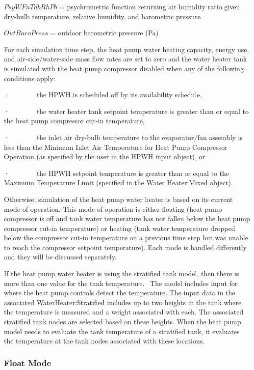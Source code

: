 \(PsyWFnTdbRhPb\) = psychrometric function returning air humidity ratio given dry-bulb temperature, relative humidity, and barometric pressure

\(OutBaroPress\) = outdoor barometric pressure (Pa)

For each simulation time step, the heat pump water heating capacity, energy use, and air-side/water-side mass flow rates are set to zero and the water heater tank is simulated with the heat pump compressor disabled when any of the following conditions apply:

·~~~~~~~~the HPWH is scheduled off by its availability schedule,

·~~~~~~~~the water heater tank setpoint temperature is greater than or equal to the heat pump compressor cut-in temperature,

·~~~~~~~~the inlet air dry-bulb temperature to the evaporator/fan assembly is less than the Minimum Inlet Air Temperature for Heat Pump Compressor Operation (as specified by the user in the HPWH input object), or

·~~~~~~~~the HPWH setpoint temperature is greater than or equal to the Maximum Temperature Limit (specified in the Water Heater:Mixed object).

Otherwise, simulation of the heat pump water heater is based on its current mode of operation. This mode of operation is either floating (heat pump compressor is off and tank water temperature has not fallen below the heat pump compressor cut-in temperature) or heating (tank water temperature dropped below the compressor cut-in temperature on a previous time step but was unable to reach the compressor setpoint temperature). Each mode is handled differently and they will be discussed separately.

If the heat pump water heater is using the stratified tank model, then there is more than one value for the tank temperature.~ The model includes input for where the heat pump controls detect the temperature. The input data in the associated WaterHeater:Stratified includes up to two heights in the tank where the temperature is measured and a weight associated with each. The associated stratified tank nodes are selected based on these heights. When the heat pump model needs to evaluate the tank temperature of a stratified tank, it evaluates the temperature at the tank nodes associated with these locations.

\subsubsection{Float Mode}\label{float-mode-000}

